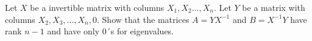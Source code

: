Let $X$ be a invertible matrix with columns $X_{1},X_{2}...,X_{n}$. Let $Y$ be a matrix with columns $X_{2},X_{3},...,X_{n},0$. Show that the matrices $A=YX^{-1}$ and $B=X^{-1}Y$ have rank $n-1$ and have only $0$´s for eigenvalues.